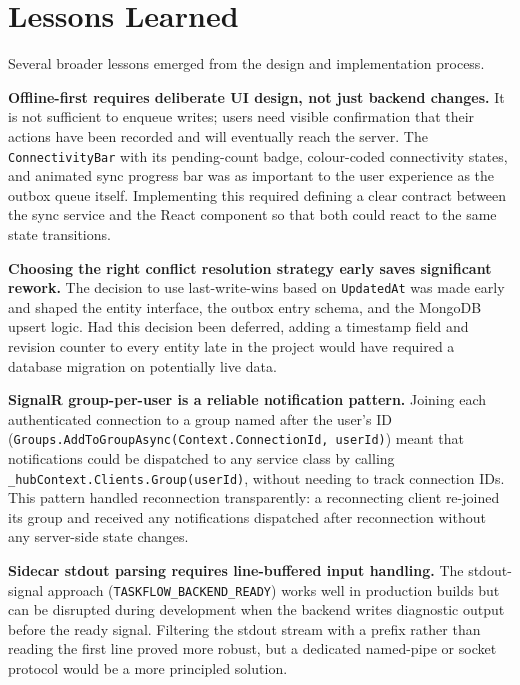 \section{Lessons Learned}\label{sec:concl_lessons}

Several broader lessons emerged from the design and implementation process.

\textbf{Offline-first requires deliberate UI design, not just backend changes.}
It is not sufficient to enqueue writes; users need visible confirmation that their
actions have been recorded and will eventually reach the server.
The \texttt{ConnectivityBar} with its pending-count badge, colour-coded connectivity
states, and animated sync progress bar was as important to the user experience as the
outbox queue itself.
Implementing this required defining a clear contract between the sync service and the
React component so that both could react to the same state transitions.

\textbf{Choosing the right conflict resolution strategy early saves significant rework.}
The decision to use last-write-wins based on \texttt{UpdatedAt} was made early and
shaped the entity interface, the outbox entry schema, and the MongoDB upsert logic.
Had this decision been deferred, adding a timestamp field and revision counter to every
entity late in the project would have required a database migration on potentially live
data.

\textbf{SignalR group-per-user is a reliable notification pattern.}
Joining each authenticated connection to a group named after the user's ID
(\texttt{Groups.}\cbrk\texttt{AddToGroupAsync(}\cbrk\texttt{Context.ConnectionId, userId)}) meant that
notifications could be dispatched to any service class by calling
\texttt{\_hubContext.}\cbrk\texttt{Clients.}\cbrk\texttt{Group(userId)}, without needing to track connection IDs.
This pattern handled reconnection transparently: a reconnecting client re-joined its
group and received any notifications dispatched after reconnection without any
server-side state changes.

\textbf{Sidecar stdout parsing requires line-buffered input handling.}
The stdout-signal approach (\texttt{TASKFLOW\_BACKEND\_READY}) works well in
production builds but can be disrupted during development when the backend
writes diagnostic output before the ready signal.
Filtering the stdout stream with a prefix rather than reading the first line
proved more robust, but a dedicated named-pipe or socket
protocol would be a more principled solution.

